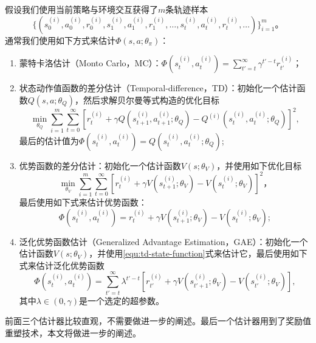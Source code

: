 假设我们使用当前策略与环境交互获得了$m$条轨迹样本
\begin{equation}
\{(s^{(i)}_0, a^{(i)}_0, r^{(i)}_0, s^{(i)}_1, a^{(i)}_1, r^{(i)}_1, \ldots, s^{(i)}_t, a^{(i)}_t, r^{(i)}_t, \ldots)\}^m_{i=1}。
\end{equation}
通常我们使用如下方式来估计$\Phi(s, a; \theta_\pi)$：
\begin{enumerate}
    \item 蒙特卡洛估计（Monto Carlo，MC）：$\Phi(s^{(i)}_t, a^{(i)}_t) = \sum^{\infty}_{t'=t} \gamma^{t' - t} r^{(i)}_{t'}$；
    \item 状态动作值函数的差分估计（Temporal-difference，TD）：初始化一个估计函数$Q(s, a; \theta_Q)$，然后求解贝尔曼等式构造的优化目标
    \begin{equation}\label{equ:td-state-action-function}
    \min_{\theta_Q} \sum^{m}_{i=1} \sum^{\infty}_{t=0}[r^{(i)}_t + \gamma Q(s^{(i)}_{t+1}, a^{(i)}_{t+1}; \theta_Q) - Q^{(i)}(s^{(i)}_t, a^{(i)}_t; \theta_Q)]^2,
    \end{equation}
    最后的估计值为$\Phi(s^{(i)}_t, a^{(i)}_t) = Q(s^{(i)}_t, a^{(i)}_t; \theta_Q)$;
    \item 优势函数的差分估计：初始化一个估计函数$V(s; \theta_V)$，并使用如下优化目标
    \begin{equation}\label{equ:td-state-function}
    \min_{\theta_V} \sum^{m}_{i=1} \sum^{\infty}_{t=0}[r^{(i)}_t + \gamma V(s^{(i)}_{t+1}; \theta_V) - V(s^{(i)}_t; \theta_V)]^2，
    \end{equation}
    最后使用如下式来估计优势函数：
    \begin{equation}
        \Phi(s^{(i)}_t, a^{(i)}_t) = r^{(i)}_t + \gamma V(s^{(i)}_{t+1};\theta_V) - V(s^{(i)}_t;\theta_V);
    \end{equation}
    \item 泛化优势函数估计（Generalized Advantage Estimation，GAE）\cite{schulman2015high}：初始化一个估计函数$V(s; \theta_V)$，并使用\eqref{equ:td-state-function}式来估计它，最后使用如下式来估计泛化优势函数
    \begin{equation}
        \Phi(s^{(i)}_t, a^{(i)}_t) = \sum^{\infty}_{t'=t}\lambda^{t'-t}[r^{(i)}_{t'} + \gamma V(s^{(i)}_{t'+1};\theta_V) - V(s^{(i)}_{t'};\theta_V)],
    \end{equation}
    其中$\lambda\in(0, \gamma)$是一个选定的超参数。
\end{enumerate}

前面三个估计器比较直观，不需要做进一步的阐述。最后一个估计器用到了奖励值重塑技术，本文将做进一步的阐述。

